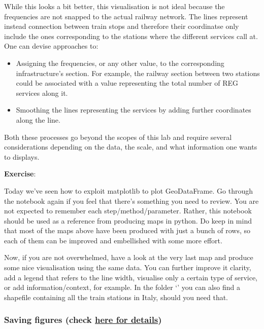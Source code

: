 \documentclass[
  letterpaper,
  DIV=11,
  numbers=noendperiod]{scrreprt}
\providecommand{\tightlist}{%
  \setlength{\itemsep}{0pt}\setlength{\parskip}{0pt}}\usepackage{longtable,booktabs,array}
\begin{document}
While this looks a bit better, this visualisation is not ideal because
the frequencies are not snapped to the actual railway network. The lines
represent instead connection between train stops and therefore their
coordinatse only include the ones corresponding to the stations where
the different services call at. One can devise approaches to:

\begin{itemize}
\tightlist
\item
  Assigning the frequencies, or any other value, to the corresponding
  infrastructure's section. For example, the railway section between two
  stations could be associated with a value representing the total
  number of REG services along it.
\item
  Smoothing the lines representing the services by adding further
  coordinates along the line.
\end{itemize}

Both these processes go beyond the scopes of this lab and require
several considerations depending on the data, the scale, and what
information one wants to displays.

\textbf{Exercise}:

Today we've seen how to exploit matplotlib to plot GeoDataFrame. Go
through the notebook again if you feel that there's something you need
to review. You are not expected to remember each step/method/parameter.
Rather, this notebook should be used as a reference from producing maps
in python. Do keep in mind that most of the maps above have been
produced with just a bunch of rows, so each of them can be improved and
embellished with some more effort.

Now, if you are not overwhelmed, have a look at the very last map and
produce some nice visualisation using the same data. You can further
improve it clarity, add a legend that refers to the line width,
visualise only a certain type of service, or add information/context,
for example. In the folder `\data' you can also find a shapefile
containing all the train stations in Italy, should you need that.

\subsubsection{\texorpdfstring{Saving figures (check
\href{https://matplotlib.org/stable/api/_as_gen/matplotlib.pyplot.savefig.html}{here
for
details})}{Saving figures (check here for details)}}\label{saving-figures-check-here-for-details}
\end{document}

